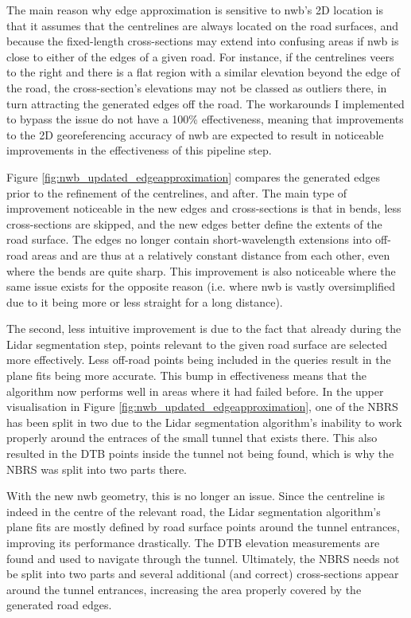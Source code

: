 The main reason why edge approximation is sensitive to \ac{nwb}'s 2D location is that it assumes that the centrelines are always located on the road surfaces, and because the fixed-length cross-sections may extend into confusing areas if \ac{nwb} is close to either of the edges of a given road. For instance, if the centrelines veers to the right and there is a flat region with a similar elevation beyond the edge of the road, the cross-section's elevations may not be classed as outliers there, in turn attracting the generated edges off the road. The workarounds I implemented to bypass the issue do not have a 100\% effectiveness, meaning that improvements to the 2D georeferencing accuracy of \ac{nwb} are expected to result in noticeable improvements in the effectiveness of this pipeline step.

Figure \ref{fig:nwb_updated_edgeapproximation} compares the generated edges prior to the refinement of the centrelines, and after. The main type of improvement noticeable in the new edges and cross-sections is that in bends, less cross-sections are skipped, and the new edges better define the extents of the road surface. The edges no longer contain short-wavelength extensions into off-road areas and are thus at a relatively constant distance from each other, even where the bends are quite sharp. This improvement is also noticeable where the same issue exists for the opposite reason (i.e. where \ac{nwb} is vastly oversimplified due to it being more or less straight for a long distance).

The second, less intuitive improvement is due to the fact that already during the Lidar segmentation step, points relevant to the given road surface are selected more effectively. Less off-road points being included in the queries result in the plane fits being more accurate. This bump in effectiveness means that the algorithm now performs well in areas where it had failed before. In the upper visualisation in Figure \ref{fig:nwb_updated_edgeapproximation}, one of the NBRS has been split in two due to the Lidar segmentation algorithm's inability to work properly around the entraces of the small tunnel that exists there. This also resulted in the DTB points inside the tunnel not being found, which is why the NBRS was split into two parts there.

With the new \ac{nwb} geometry, this is no longer an issue. Since the centreline is indeed in the centre of the relevant road, the Lidar segmentation algorithm's plane fits are mostly defined by road surface points around the tunnel entrances, improving its performance drastically. The DTB elevation measurements are found and used to navigate through the tunnel. Ultimately, the NBRS needs not be split into two parts and several additional (and correct) cross-sections appear around the tunnel entrances, increasing the area properly covered by the generated road edges.


